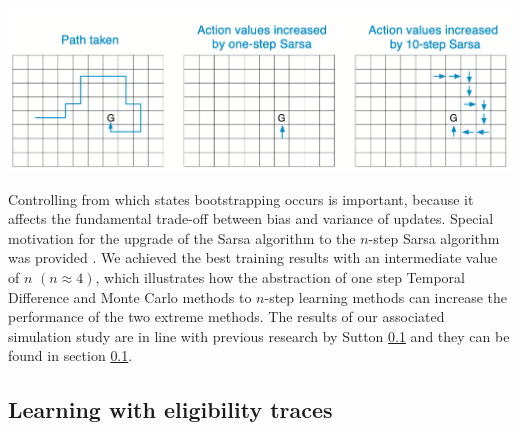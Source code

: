 \begin{minipage}{\linewidth}
\begin{center}
\includegraphics[scale=0.5]{graphics/n_step_sarsa.png}
\end{center}
\end{minipage}

Controlling from which states bootstrapping occurs is important, because it affects the fundamental trade-off between bias and variance of updates. Special motivation for the upgrade of the Sarsa algorithm to the $n$-step Sarsa algorithm was provided \cite{Seijen16}. We achieved the best training results with an intermediate value of $n$ $(n \approx 4)$, which illustrates how the abstraction of one step Temporal Difference and Monte Carlo methods to $n$-step learning methods can increase the performance of the two extreme methods. The results of our associated simulation study are in line with previous research by Sutton \ref{} and they can be found in section \ref{}. 

\subsection{Learning with eligibility traces}

